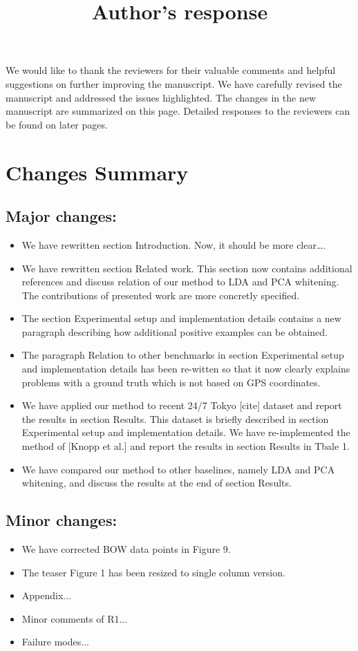 \documentclass[a4paper,12pt]{article}
\title{Author’s response}
\date{}
\begin{document}
\maketitle
\vspace{-2cm}
We would like to thank the reviewers for their valuable comments and helpful suggestions on further improving the manuscript. We have carefully revised the manuscript and addressed the issues highlighted. The changes in the new manuscript are summarized on this page. Detailed responses to the reviewers can be found on later pages.

\section*{Changes Summary}
\subsection*{Major changes:}
\begin{itemize}
\itemsep0em
	\item We have rewritten section Introduction. Now, it should be more clear….
	\item We have rewritten section Related work. This section now contains additional references and discuss relation of our method to LDA and PCA whitening. The contributions of presented work are more concretly specified.
	\item The section Experimental setup and implementation details contains a new paragraph describing how additional positive examples can be obtained.
	\item The paragraph Relation to other benchmarks in section Experimental setup and implementation details has been re-witten so that it now clearly explains problems with a ground truth which is not based on GPS coordinates.
	\item We have applied our method to recent 24/7 Tokyo [cite] dataset and report the results in section Results. This dataset is briefly described in section Experimental setup and implementation details.
	We have re-implemented the method of [Knopp et al.] and report the results in section Results in Tbale 1.
	\item We have compared our method to other baselines, namely LDA and PCA whitening, and discuss the results at the end of section Results.
\end{itemize}

\subsection*{Minor changes:}
\begin{itemize}
\itemsep0em
	\item We have corrected BOW data points in Figure 9.
	\item The teaser Figure 1 has been resized to single column version.
	\item Appendix...
	\item Minor comments of R1...
	\item Failure modes...
\end{itemize}
\end{document}
